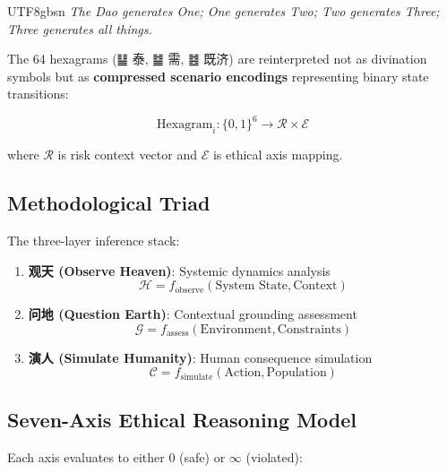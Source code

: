 \documentclass[conference]{IEEEtran}
\begin{document}
\begin{CJK}{UTF8}{gbsn}
\textit{The Dao generates One; One generates Two; Two generates Three; Three generates all things.}

The 64 hexagrams (䷊ 泰, ䷄ 需, ䷾ 既济) are reinterpreted not as divination symbols but as \textbf{compressed scenario encodings} representing binary state transitions:

\begin{equation}
\text{Hexagram}_i: \{0,1\}^6 \rightarrow \mathcal{R} \times \mathcal{E}
\end{equation}

where $\mathcal{R}$ is risk context vector and $\mathcal{E}$ is ethical axis mapping.

\subsection{Methodological Triad}

The three-layer inference stack:

\begin{enumerate}
    \item \textbf{观天 (Observe Heaven)}: Systemic dynamics analysis
    \begin{equation}
    \mathcal{H} = f_{\text{observe}}(\text{System State}, \text{Context})
    \end{equation}
    
    \item \textbf{问地 (Question Earth)}: Contextual grounding assessment
    \begin{equation}
    \mathcal{G} = f_{\text{assess}}(\text{Environment}, \text{Constraints})
    \end{equation}
    
    \item \textbf{演人 (Simulate Humanity)}: Human consequence simulation
    \begin{equation}
    \mathcal{C} = f_{\text{simulate}}(\text{Action}, \text{Population})
    \end{equation}
\end{enumerate}

\subsection{Seven-Axis Ethical Reasoning Model}

Each axis evaluates to either $0$ (safe) or $\infty$ (violated):


\end{CJK}
\end{document}
